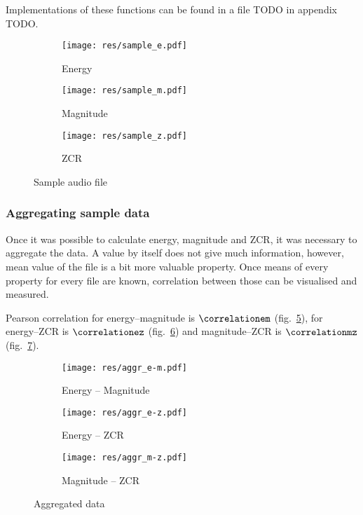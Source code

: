 \documentclass[english,11pt]{article}
\numberwithin{equation}{section}
\begin{document}
Implementations of these functions can be found in a file TODO in
appendix TODO.

\begin{figure}
    \centering
    \begin{subfigure}[b]{0.6\textwidth}
        \texttt{[image: res/sample\_e.pdf]}
        \caption{Energy}
        \label{fig:sample_e}
    \end{subfigure}

    \begin{subfigure}[b]{0.6\textwidth}
        \texttt{[image: res/sample\_m.pdf]}
        \caption{Magnitude}
        \label{fig:sample_m}
    \end{subfigure}

    \begin{subfigure}[b]{0.6\textwidth}
        \texttt{[image: res/sample\_z.pdf]}
        \caption{ZCR}
        \label{fig:sample_z}
    \end{subfigure}
    \caption{Sample audio file}\label{fig:sample}
\end{figure}

\subsubsection{Aggregating sample data}
\label{sec:aggregating}

Once it was possible to calculate energy, magnitude and ZCR, it was necessary
to aggregate the data. A value by itself does not give much information,
however, mean value of the file is a bit more valuable property. Once means of
every property for every file are known, correlation between those can be
visualised and measured.

Pearson correlation for energy--magnitude is $\correlationem$
(fig.~\ref{fig:aggr_e-m}), for energy--ZCR is $\correlationez$
(fig.~\ref{fig:aggr_e-z}) and magnitude--ZCR is $\correlationmz$
(fig.~\ref{fig:aggr_m-z}).

\begin{figure}
    \centering
    \begin{subfigure}[b]{0.6\textwidth}
        \texttt{[image: res/aggr\_e-m.pdf]}
        \caption{Energy -- Magnitude}
        \label{fig:aggr_e-m}
    \end{subfigure}

    \begin{subfigure}[b]{0.6\textwidth}
        \texttt{[image: res/aggr\_e-z.pdf]}
        \caption{Energy -- ZCR}
        \label{fig:aggr_e-z}
    \end{subfigure}

    \begin{subfigure}[b]{0.6\textwidth}
        \texttt{[image: res/aggr\_m-z.pdf]}
        \caption{Magnitude -- ZCR}
        \label{fig:aggr_m-z}
    \end{subfigure}
    \caption{Aggregated data}\label{fig:aggr}
\end{figure}
\end{document}
